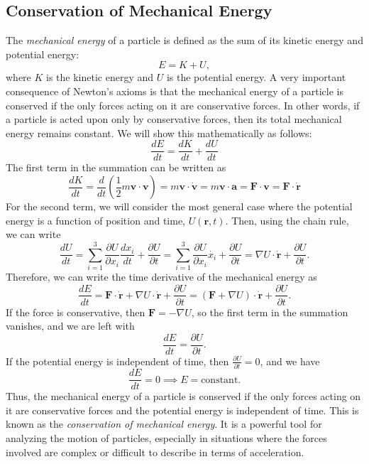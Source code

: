 \documentclass[../main.tex]{subfiles}
\begin{document}
\subsection{Conservation of Mechanical Energy}
The \emph{mechanical energy} of a particle is defined as the sum of its kinetic energy and potential energy:
\begin{equation}
    E = K + U,
\end{equation}
where $K$ is the kinetic energy and $U$ is the potential energy. A very important consequence of Newton's axioms is that the mechanical energy of a particle is conserved if the only forces acting on it are conservative forces. In other words, if a particle is acted upon only by conservative forces, then its total mechanical energy remains constant. We will show this mathematically as follows:
\begin{equation}
    \frac{dE}{dt} = \frac{dK}{dt} + \frac{dU}{dt} 
\end{equation}
The first term in the summation can be written as
\begin{equation}
\frac{dK}{dt} = \frac{d}{dt}\left(\frac{1}{2}m\mathbf{v}\cdot\mathbf{v}\right) = m \mathbf{v}\cdot\dot{\mathbf{v}} = m \mathbf{v}\cdot\mathbf{a} = \mathbf{F}\cdot\mathbf{v} = \mathbf{F}\cdot\dot{\mathbf{r}}
\end{equation}
For the second term, we will consider the most general case where the potential energy is a function of position and time, $U(\mathbf{r},t)$. Then, using the chain rule, we can write
\begin{equation}
\frac{dU}{dt} = \sum_{i=1}^{3} \frac{\partial U}{\partial x_i}\frac{dx_i}{dt} + \frac{\partial U}{\partial t} = \sum_{i=1}^{3} \frac{\partial U}{\partial x_i}\dot{x_i} + \frac{\partial U}{\partial t} = \nabla U\cdot\dot{\mathbf{r}} + \frac{\partial U}{\partial t}.
\end{equation}
Therefore, we can write the time derivative of the mechanical energy as
\begin{equation}
\frac{dE}{dt} = \mathbf{F}\cdot\dot{\mathbf{r}} + \nabla U\cdot\dot{\mathbf{r}} + \frac{\partial U}{\partial t} = (\mathbf{F} + \nabla U)\cdot\dot{\mathbf{r}} + \frac{\partial U}{\partial t}.
\end{equation}
If the force is conservative, then $\mathbf{F} = -\nabla U$, so the first term in the summation vanishes, and we are left with
\begin{equation}
\frac{dE}{dt} = \frac{\partial U}{\partial t}.
\end{equation}
If the potential energy is independent of time, then $\frac{\partial U}{\partial t} = 0$, and we have
\begin{equation}
\frac{dE}{dt} = 0 \implies E = \text{constant}.
\end{equation}
Thus, the mechanical energy of a particle is conserved if the only forces acting on it are conservative forces and the potential energy is independent of time. This is known as the \emph{conservation of mechanical energy}. It is a powerful tool for analyzing the motion of particles, especially in situations where the forces involved are complex or difficult to describe in terms of acceleration.
\end{document}
